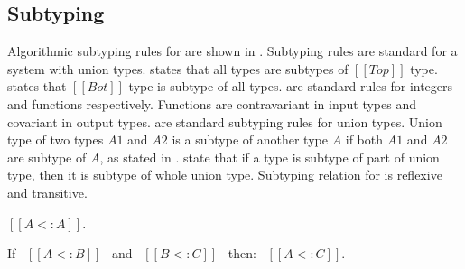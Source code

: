 \subsection{Subtyping}
\label{sec:union:sub}
Algorithmic subtyping rules for \cal are shown in . Subtyping rules are standard
for a system with union types.
 states that all types are subtypes of $[[Top]]$ type.  states that $[[Bot]]$ type 
is subtype of all types.  are standard rules for integers and functions respectively.
Functions are contravariant in input types and covariant in output types.  are
standard subtyping rules for union types. Union type of two types $A1$ and $A2$ is a subtype of another
type $A$ if both $A1$ and $A2$ are subtype of $A$, as stated in .  state
that if a type is subtype of part of union type, then it is subtype of whole union type.
Subtyping relation for \cal is reflexive and transitive.

\begin{lemma}
  $[[A <: A]]$.
\label{lemma:union:refl}
\end{lemma}

\begin{comment}
\begin{proof}
  By induction on type A. All cases are trivial to prove.
\end{proof}
\end{comment}

\begin{lemma}
  If \ $[[A <: B]]$ \ and \ $[[B <: C]]$ \ then: \ $[[A <: C]]$.
  \label{lemma:union:trans}
\end{lemma}

\begin{comment}
\begin{proof}
  By induction on type B.
  \begin{itemize}
    \item Cases $[[Top]]$, $[[Bot]]$ and $[[Int]]$ are trivial to prove.
    \item Case $[[A -> B]]$ requires double induction on type $[[C]]$
          and $[[A]]$.
    \item Case $[[A \/ B]]$ requires \Cref{lemma:union:sub-or}
  \end{itemize}
\end{proof}

\begin{lemma}[Subtyping Union Inversion]
\label{lemma:union:sub-or}
  If \ $[[A \/ B <: C]]$ then:
  \begin{enumerate}
    \item $[[A <: C]]$ and
    \item $[[B <: C]]$
  \end{enumerate}
\end{lemma}
\end{comment}



